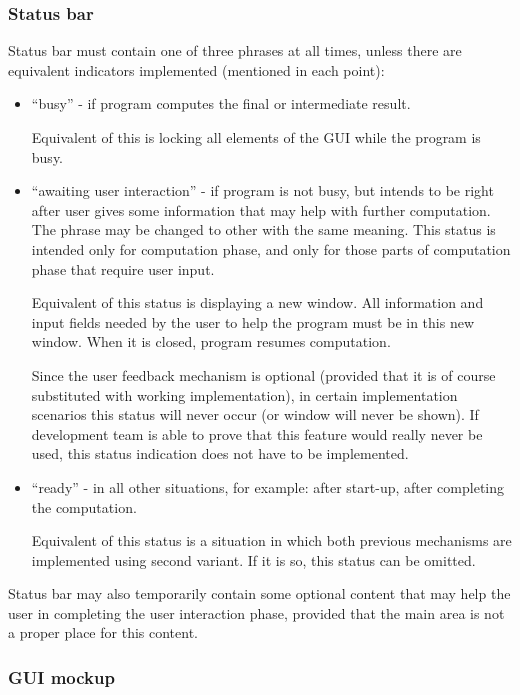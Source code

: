 \documentclass{article}
\begin{document}
\subsubsection{Status bar}
Status bar must contain one of three phrases at all times, unless there are equivalent indicators
implemented (mentioned in each point):
\begin{itemize}

  \item ``busy'' - if program computes the final or intermediate result. %
  
  Equivalent of this is locking all elements of the GUI while the program is busy.

  \item ``awaiting user interaction'' - if program is not busy, but intends to be right after user
  gives some information that may help with further computation. The phrase may be changed to other
  with the same meaning. This status is intended only for computation phase, and only for those
  parts of computation phase that require user input.
  
  Equivalent of this status is displaying a new window. All information and input fields needed by
  the user to help the program must be in this new window. When it is closed, program resumes
  computation.
  
  Since the user feedback mechanism is optional (provided that it is of course substituted with
  working implementation), in certain implementation scenarios this status will never occur (or
  window will never be shown). If development team is able to prove that this feature would really
  never be used, this status indication does not have to be implemented.

  \item ``ready'' - in all other situations, for example: after start-up, %
  after completing the computation.
  
  Equivalent of this status is a situation in which both previous mechanisms are implemented using
  second variant. If it is so, this status can be omitted.

\end{itemize}

Status bar may also temporarily contain some optional content that may help the user in completing
the user interaction phase, provided that the main area is not a proper place for this content.

\subsubsection{GUI mockup}
\end{document}
